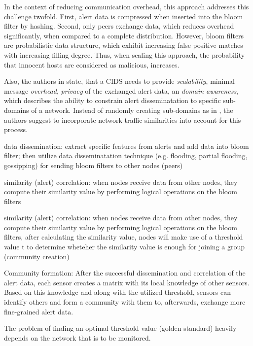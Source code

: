In the context of reducing communication overhead, this approach addresses this challenge twofold. First, alert data is compressed when inserted into the bloom filter by hashing. Second, only peers exchange data, which reduces overhead significantly, when compared to a complete distribution. However, bloom filters are probabilistic data structure, which exhibit increasing false positive matches with increasing filling degree. Thus, when scaling this approach, the probability that innocent hosts are considered as malicious, increases. 

Also, the authors in \cite{Vasilomanolakis2015SkipMon} state, that a CIDS needs to provide \textit{scalability}, minimal message \textit{overhead}, \textit{privacy} of the exchanged alert data, an \textit{domain awareness}, which describes the ability to constrain alert disseminatation to specific sub-domains of a network. Instead of randomly creating sub-domains as in \cite{Locasto2005}, the authors suggest to incorporate network traffic similarities into account for this process. 

data dissemination: extract specific features from alerts and add data into bloom filter; then utilize data disseminatation technique (e.g. flooding, partial flooding, gossipping) for sending bloom filters to other nodes (peers)

similarity (alert) correlation: when nodes receive data from other nodes, they compute their similarity value by performing logical operations on the bloom filters

similarity (alert) correlation: when nodes receive data from other nodes, they compute their similarity value by performing logical operations on the bloom filters, after calculating the similarity value, nodes will make use of a threshold value t to determine wheteher the similarity value is enough for joining a group (community creation)

Community formation: After the successful dissemination and correlation of the alert data, each sensor creates a matrix with its local knowledge of other sensors. Based on this knowledge and along with the utilized threshold, sensors can identify others and form a community with them to, afterwards, exchange more fine-grained alert data.

The problem of finding an optimal threshold value (golden standard) heavily depends on the network that is to be monitored.


